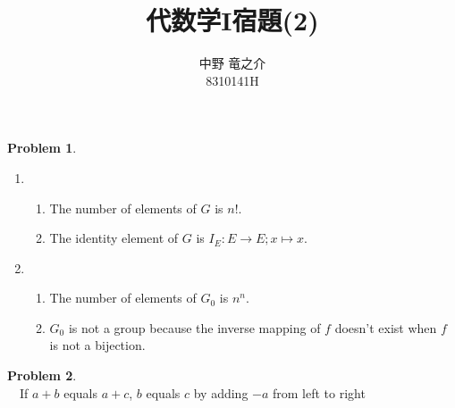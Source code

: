 \documentclass[a4paper, 12pt, fleqn, openany]{article}
\title{代数学I宿題(2)}
\author{中野 竜之介\\ 8310141H}
\theoremstyle{definition}
\newtheorem{prb}{Problem}
\begin{document}
\maketitle
\begin{prb}
    $ $
    \begin{enumerate}
        \item
        \begin{enumerate}
            \item The number of elements of $G$ is $n!$.
            \item The identity element of $G$ is $I_E : E \to E;x\mapsto x$.
        \end{enumerate}

        \item
            \begin{enumerate}
                \item The number of elements of $G_0$ is $n^n$.
                \item $G_0$ is not a group because the inverse mapping of $f$ doesn't exist when $f$ is not a bijection.
            \end{enumerate}
    \end{enumerate}
\end{prb}

\begin{prb}
    $ $\\
    　If $a+b$ equals $a+c$, $b$ equals $c$ by adding $-a$ from left to right
\end{prb}
\end{document}
